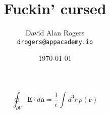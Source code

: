 \documentclass{article}
\title{Fuckin' cursed}
\date{\today}
\author{David Alan Rogers \\ \texttt{drogers@appacademy.io}}
\affil{AppAcademy}
\begin{document}
  \maketitle
  \begin{multicols}{3}
    \begin{displaymath}
      \oint_{\partial V}\mathbf{E} \cdot d\mathbf{a}
      = \frac{1}{\epsilon}\int d^3r\,\rho (\mathbf{r})
    \end{displaymath}
  \end{multicols}
\end{document}
